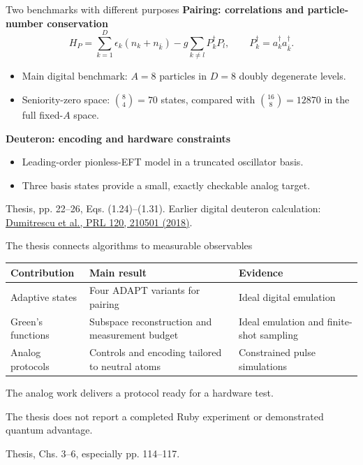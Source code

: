 \documentclass[11pt,aspectratio=169]{beamer}
\newcommand{\src}[1]{\par\vfill{\fontsize{7}{8}\selectfont\color{gray}#1\par}}
\begin{document}
\begin{frame}{Two benchmarks with different purposes}
\textbf{Pairing: correlations and particle-number conservation}
\[
 H_P=\sum_{k=1}^{D}\epsilon_k(n_k+n_{\bar k})
 -g\sum_{k\ne l}P_k^\dagger P_l,
 \qquad P_k^\dagger=a_k^\dagger a_{\bar k}^\dagger .
\]
\begin{itemize}
\item Main digital benchmark: $A=8$ particles in $D=8$ doubly degenerate levels.
\item Seniority-zero space: $\binom{8}{4}=70$ states, compared with $\binom{16}{8}=12870$ in the full fixed-$A$ space.
\end{itemize}
\medskip
\textbf{Deuteron: encoding and hardware constraints}
\begin{itemize}
\item Leading-order pionless-EFT model in a truncated oscillator basis.
\item Three basis states provide a small, exactly checkable analog target.
\end{itemize}
\src{Thesis, pp. 22--26, Eqs. (1.24)--(1.31). Earlier digital deuteron calculation: \href{https://doi.org/10.1103/PhysRevLett.120.210501}{Dumitrescu et al., PRL 120, 210501 (2018)}.}
\end{frame}

\begin{frame}{The thesis connects algorithms to measurable observables}
\renewcommand{\arraystretch}{1.5}
\begin{tabular}{@{}p{}p{}p{}@{}}
\toprule
\textbf{Contribution}&\textbf{Main result}&\textbf{Evidence}\\
\midrule
Adaptive states&Four ADAPT variants for pairing&Ideal digital emulation\\
Green's functions&Subspace reconstruction and measurement budget&Ideal emulation and finite-shot sampling\\
Analog protocols&Controls and encoding tailored to neutral atoms&Constrained pulse simulations\\
\bottomrule
\end{tabular}\par
\medskip
\alert{The analog work delivers a protocol ready for a hardware test.}\par
The thesis does not report a completed Ruby experiment or demonstrated quantum advantage.
\src{Thesis, Chs. 3--6, especially pp. 114--117.}
\end{frame}
\end{document}
